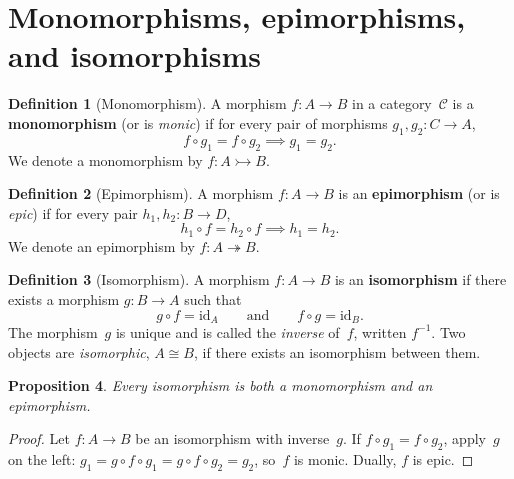 \documentclass[a4paper,12pt]{book}
\newcommand{\id}{\mathrm{id}}
\theoremstyle{definition}
\newtheorem{definition}{Definition}[section]
\theoremstyle{plain}
\newtheorem{proposition}[definition]{Proposition}
\theoremstyle{remark}
\begin{document}
\section{Monomorphisms, epimorphisms, and isomorphisms}
\label{sec:mono-epi-iso}

\begin{definition}[Monomorphism]\label{def:mono}
A morphism $f\colon A\to B$ in a category~$\mathcal{C}$ is a
\textbf{monomorphism} (or is \emph{monic}) if for every pair of
morphisms $g_1,g_2\colon C\to A$,
\[
    f\circ g_1 = f\circ g_2 \implies g_1 = g_2.
\]
We denote a monomorphism by $f\colon A\rightarrowtail B$.
\end{definition}

\begin{definition}[Epimorphism]\label{def:epi}
A morphism $f\colon A\to B$ is an \textbf{epimorphism} (or is
\emph{epic}) if for every pair $h_1,h_2\colon B\to D$,
\[
    h_1\circ f = h_2\circ f \implies h_1 = h_2.
\]
We denote an epimorphism by $f\colon A\twoheadrightarrow B$.
\end{definition}

\begin{definition}[Isomorphism]\label{def:iso}
A morphism $f\colon A\to B$ is an \textbf{isomorphism} if there exists a
morphism $g\colon B\to A$ such that
\[
    g\circ f = \id_A \qquad\text{and}\qquad f\circ g = \id_B.
\]
The morphism~$g$ is unique and is called the \emph{inverse} of~$f$,
written $f^{-1}$.  Two objects are \emph{isomorphic},
$A\cong B$, if there exists an isomorphism
between them.
\end{definition}

\begin{proposition}\label{prop:iso-mono-epi}
Every isomorphism is both a monomorphism and an epimorphism.
\end{proposition}

\begin{proof}
Let $f\colon A\to B$ be an isomorphism with inverse~$g$.
If $f\circ g_1 = f\circ g_2$, apply~$g$ on the left:
$g_1 = g\circ f\circ g_1 = g\circ f\circ g_2 = g_2$,
so~$f$ is monic.  Dually, $f$ is epic.
\end{proof}
\end{document}
